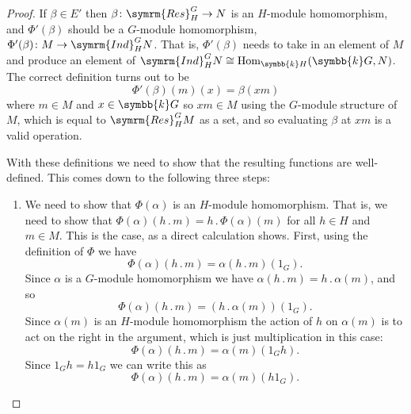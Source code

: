 \documentclass[fleqn]{NotesClass}
\renewcommand{\field}{\symbb{k}}
\DeclareMathOperator{\Hom}{Hom}
\newcommand{\action}{\mathbin{.}}
\newcommand{\isomorphic}{\cong}
\newcommand{\Res}{\symrm{Res}}
\newcommand{\Ind}{\symrm{Ind}}
\begin{document}
\begin{thm}{}{}
\begin{proof}
            If \(\beta \in E'\) then \(\beta \colon \Res^G_H \to N\) is an \(H\)-module homomorphism, and \(\Phi'(\beta)\) should be a \(G\)-module homomorphism, \(\Phi'(\beta) \colon M \to \Ind^G_H N\).
            That is, \(\Phi'(\beta)\) needs to take in an element of \(M\) and produce an element of \(\Ind^G_HN \isomorphic \Hom_{\field H}(\field G, N)\).
            The correct definition turns out to be
            \begin{equation}
                \Phi'(\beta)(m)(x) = \beta(xm)
            \end{equation}
            where \(m \in M\) and \(x \in \field G\) so \(xm \in M\) using the \(G\)-module structure of \(M\), which is equal to \(\Res^G_HM\) as a set, and so evaluating \(\beta\) at \(xm\) is a valid operation.
            
            With these definitions we need to show that the resulting functions are well-defined.
            This comes down to the following three steps:
            \begin{enumerate}
                \item We need to show that \(\Phi(\alpha)\) is an \(H\)-module homomorphism.
                That is, we need to show that \(\Phi(\alpha)(h \action m) = h \action \Phi(\alpha)(m)\) for all \(h \in H\) and \(m \in M\).
                This is the case, as a direct calculation shows.
                First, using the definition of \(\Phi\) we have
                \begin{equation}
                    \Phi(\alpha)(h \action m) = \alpha(h \action m)(1_G).
                \end{equation}
                Since \(\alpha\) is a \(G\)-module homomorphism we have \(\alpha(h \action m) = h \action \alpha(m)\), and so
                \begin{equation}
                    \Phi(\alpha)(h \action m) = (h \action \alpha(m))(1_G).
                \end{equation}
                Since \(\alpha(m)\) is an \(H\)-module homomorphism the action of \(h\) on \(\alpha(m)\) is to act on the right in the argument, which is just multiplication in this case:
                \begin{equation}
                    \Phi(\alpha)(h \action m) = \alpha(m)(1_Gh).
                \end{equation}
                Since \(1_Gh = h1_G\) we can write this as
                \begin{equation}
                    \Phi(\alpha)(h \action m) = \alpha(m)(h1_G).

\end{equation}
\end{enumerate}
\end{proof}
\end{thm}
\end{document}
